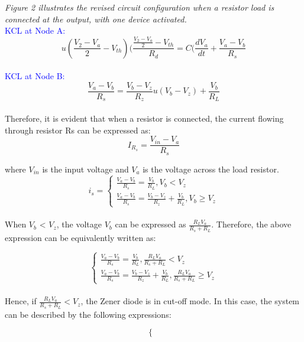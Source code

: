 \emph{Figure 2 illustrates the revised circuit configuration when a resistor load is connected at the output, with one device activated.}\\

\textcolor{blue}{KCL at Node A:}\\

\begin{equation}
    u(\frac{V_2-V_a}{2}-V_{th})(\frac{\frac{V_2-V_a}{2}-V_{th}}{R_d}=C(\frac{dV_a}{dt}+\frac{V_a-V_b}{R_s}
\end{equation}\\

\textcolor{blue}{KCL at Node B:}\\

\begin{equation}
    \frac{V_a-V_b}{R_s}=\frac{V_b-V_z}{R_z}u(V_b-V_z)+\frac{V_b}{R_L}
\end{equation}\\

Therefore, it is evident that when a resistor is connected, the current flowing through resistor Rs can be expressed as:
\begin{equation}
    I_{R_s} = \frac{V_{in} - V_a}{R_s}
\end{equation}


where $V_{in}$ is the input voltage and $V_a$ is the voltage across the load resistor.\\

\begin{equation}
    i_s=\begin{cases}
        \frac{V_a-V_b}{R_s}=\frac{V_b}{R_L},  V_b<V_z\\
        \frac{V_a-V_b}{R_s}=\frac{V_b-V_z}{R_z}+\frac{V_b}{R_L},  V_b \geq V_z
    \end{cases}
\end{equation}\\

When $V_b$ < $V_z$, the voltage $V_b$ can be expressed as $\frac{R_LV_a}{R_s+R_L}$. Therefore, the above expression can be equivalently written as:

\begin{equation}
    \begin{cases}
        \frac{V_a-V_b}{R_s}=\frac{V_b}{R_L}, \frac{R_LV_a}{R_s+R_L}<V_z\\
        \frac{V_a-V_b}{R_s}=\frac{V_b-V_z}{R_z}+\frac{V_b}{R_L}, \frac{R_LV_a}{R_s+R_L} \geq V_z
    \end{cases}
\end{equation}\\

Hence, if $\frac{R_LV_a}{R_s+R_L}<V_z$, the Zener diode is in cut-off mode. In this case, the system can be described by the following expressions:

\begin{equation}
    \begin{cases}
        
    \end{cases}
\end{equation}


